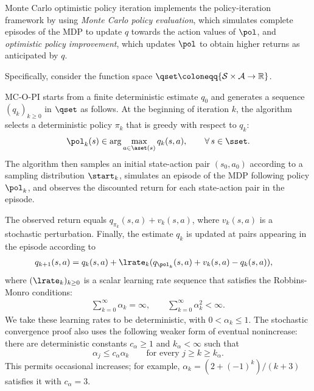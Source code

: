 Monte Carlo optimistic policy iteration implements the policy-iteration framework by using 
\textit{Monte Carlo policy evaluation}, which simulates complete episodes of the MDP to update $q$ towards the action values of $\pol$,
and \textit{optimistic policy improvement}, which updates $\pol$ to obtain higher returns as anticipated by $q$.


Specifically, consider the function space $\qset \coloneqq \{ \mathcal S \times \mathcal A \to \mathbb R \}$.

MC-O-PI starts from a finite deterministic estimate $q_0$ and generates a sequence $(q_k)_{k \ge 0}$ in $\qset$ as follows.
At the beginning of iteration $k$, the algorithm selects a deterministic policy $\pi_k$ that is greedy with respect to $q_k$:
\begin{align}
\label{eq: greedy policy definition}
    \pol_k(s) \in \arg\max_{a \in \aset(s)} q_k(s,a),
    \qquad \forall \, s \in \sset .
\end{align}
The algorithm then samples an initial state-action pair $(s_0, a_0)$ according to a sampling distribution $\start_k$,
simulates an episode of the MDP following policy $\pol_k$, and observes the discounted return for each state-action pair in the episode.

The observed return equals $q_{\pi_k}(s,a) + v_k(s,a)$, where $v_k(s,a)$ is a stochastic perturbation.
Finally, the estimate $q_k$ is updated at pairs appearing in the episode
according to
\begin{align}
\label{eq: MC eval update}
    q_{k+1}(s, a) 
    &= q_k(s,a) +  \lrate_k( q_{\pol_k}(s, a) + v_k(s, a) - q_k(s,a) ) ,


\end{align}
where $(\lrate_k)_{k \ge 0}$ is a scalar learning rate sequence that satisfies the Robbins-Monro conditions:
\begin{align}
 \label{eq: robbins monro conditions}


    \sum_{k =0}^\infty \alpha_k = \infty , 
    \qquad
    \sum_{k =0}^\infty \alpha_k^2 < \infty .
\end{align}
We take these learning rates to be deterministic, with $0<\alpha_k\le1$. The stochastic convergence proof also uses the following weaker form of eventual nonincrease: there are deterministic constants $c_\alpha\ge1$ and $k_\alpha<\infty$ such that
\begin{equation}
\label{eq:comparison}
\alpha_j\le c_\alpha\alpha_k\qquad\text{for every }j\ge k\ge k_\alpha.
\end{equation}
This permits occasional increases; for example, $\alpha_k=(2+(-1)^k)/(k+3)$ satisfies it with $c_\alpha=3$.




